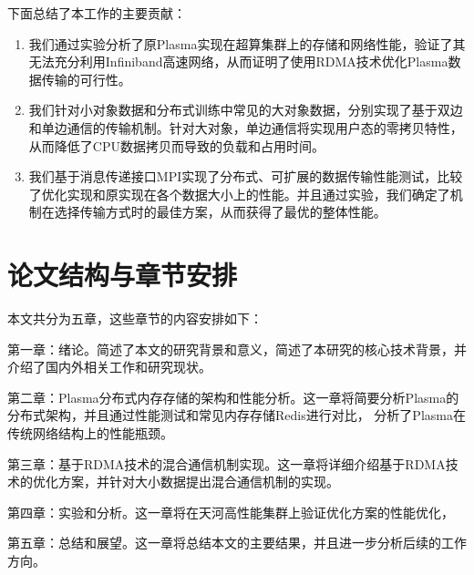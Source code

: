 下面总结了本工作的主要贡献：

\begin{enumerate}
	\item 我们通过实验分析了原Plasma实现在超算集群上的存储和网络性能，验证了其无法充分利用Infiniband高速网络，从而证明了使用RDMA技术优化Plasma数据传输的可行性。
	\item 我们针对小对象数据和分布式训练中常见的大对象数据，分别实现了基于双边和单边通信的传输机制。针对大对象，单边通信将实现用户态的零拷贝特性，从而降低了CPU数据拷贝而导致的负载和占用时间。
	\item 我们基于消息传递接口MPI实现了分布式、可扩展的数据传输性能测试，比较了优化实现和原实现在各个数据大小上的性能。并且通过实验，我们确定了机制在选择传输方式时的最佳方案，从而获得了最优的整体性能。
\end{enumerate}

\section{论文结构与章节安排}
\label{sec:arrangement}

本文共分为五章，这些章节的内容安排如下：

第一章：绪论。简述了本文的研究背景和意义，简述了本研究的核心技术背景，并介绍了国内外相关工作和研究现状。

第二章：Plasma分布式内存存储的架构和性能分析。这一章将简要分析Plasma的分布式架构，并且通过性能测试和常见内存存储Redis进行对比，
分析了Plasma在传统网络结构上的性能瓶颈。

第三章：基于RDMA技术的混合通信机制实现。这一章将详细介绍基于RDMA技术的优化方案，并针对大小数据提出混合通信机制的实现。

第四章：实验和分析。这一章将在天河高性能集群上验证优化方案的性能优化，

第五章：总结和展望。这一章将总结本文的主要结果，并且进一步分析后续的工作方向。

